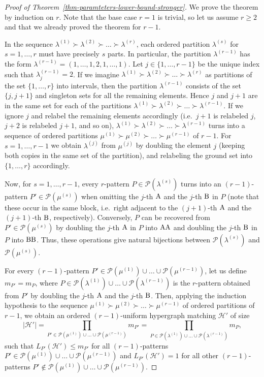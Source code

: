 \documentclass[10pt,a4paper]{amsart}
\theoremstyle{definition}
\newcommand{\HH}{\mathcal{H}}
\newcommand{\PP}{\mathcal{P}}
\begin{document}
\begin{proof}[Proof of Theorem~\ref{thm-paramteters-lower-bound-stronger}]
We prove the theorem by induction on $r$. Note that the base case $r=1$ is trivial, so let us assume $r\ge 2$ and that we already proved the theorem for $r-1$.

In the sequence $\lambda^{(1)} \succ \lambda^{(2)} \succ \dots \succ \lambda^{(r)}$, each ordered partition $\lambda^{(s)}$ for $s=1,\dots,r$ must have precisely $s$ parts. In particular, the partition $\lambda^{(r-1)}$ has the form $\lambda^{(r-1)}=(1,\dots,1,2,1,\dots,1)$. Let $j\in \{1,\dots,r-1\}$ be the unique index such that $\lambda^{(r-1)}_j=2$. If we imagine $\lambda^{(1)} \succ \lambda^{(2)} \succ \dots \succ \lambda^{(r)}$ as partitions of the set $\{1,\dots,r\}$ into intervals, then the partition  $\lambda^{(r-1)}$ consists of the set $\{j,j+1\}$ and singleton sets for all the remaining elements. Hence $j$ and $j+1$ are in the same set for each of the partitions $\lambda^{(1)} \succ \lambda^{(2)} \succ \dots \succ \lambda^{(r-1)}$. If we ignore $j$ and relabel the remaining elements accordingly (i.e.\ $j+1$ is relabeled $j$, $j+2$ is relabeled $j+1$, and so on), $\lambda^{(1)} \succ \lambda^{(2)} \succ \dots \succ \lambda^{(r-1)}$ turns into a sequence of ordered partitions $\mu^{(1)} \succ \mu^{(2)} \succ \dots \succ \mu^{(r-1)}$ of $r-1$. For $s=1,\dots,r-1$ we obtain $\lambda^{(j)}$ from $\mu^{(j)}$ by doubling the element $j$ (keeping both copies in the same set of the partition), and relabeling the ground set into $\{1,\dots,r\}$ accordingly.

Now, for $s=1,\dots,r-1$, every $r$-pattern $P\in \PP(\lambda^{(s)})$ turns into an $(r-1)$-pattern $P'\in \PP(\mu^{(s)})$ when omitting the $j$-th $\rm A$ and the $j$-th $\rm B$ in $P$ (note that these occur in the same block, i.e.\ right adjacent to the $(j+1)$-th $\rm A$ and the $(j+1)$-th $\rm B$, respectively). Conversely, $P$ can be recovered from $P'\in \PP(\mu^{(s)})$ by doubling the $j$-th $\rm A$
in $P$ into $\rm{AA}$ and doubling the $j$-th $\rm B$
in $P$ into $\rm{BB}$. Thus, these operations give natural bijections between $\PP(\lambda^{(s)})$ and $\PP(\mu^{(s)})$.

For every $(r-1)$-pattern $P'\in \PP(\mu^{(1)})\cup\dots\cup \PP(\mu^{(r-1)})$, let us define $m_{P'}=m_P$, where $P\in \PP(\lambda^{(1)})\cup\dots\cup \PP(\lambda^{(r-1)})$ is the $r$-pattern obtained from $P'$ by doubling the $j$-th $\rm A$ and the $j$-th $\rm B$. Then, applying the induction hypothesis to the sequence $\mu^{(1)} \succ \mu^{(2)} \succ \dots \succ \mu^{(r-1)}$ of ordered partitions of $r-1$, we obtain an ordered $(r-1)$-uniform hypergraph matching $\HH'$ of size
\[|\HH'|=\prod_{P'\in \PP(\mu^{(1)})\cup\dots\cup \PP(\mu^{(r-1)})} m_{P'}=\prod_{P\in \PP(\lambda^{(1)})\cup\dots\cup \PP(\lambda^{(r-1)})} m_{P},\]
such that $L_{P'}(\HH')\le m_{P'}$ for all $(r-1)$-patterns $P'\in \PP(\mu^{(1)})\cup\dots\cup \PP(\mu^{(r-1)})$ and $L_{P'}(\HH')=1$ for all other $(r-1)$-patterns $P'\not\in \PP(\mu^{(1)})\cup\dots\cup \PP(\mu^{(r-1)})$.


\end{proof}
\end{document}
